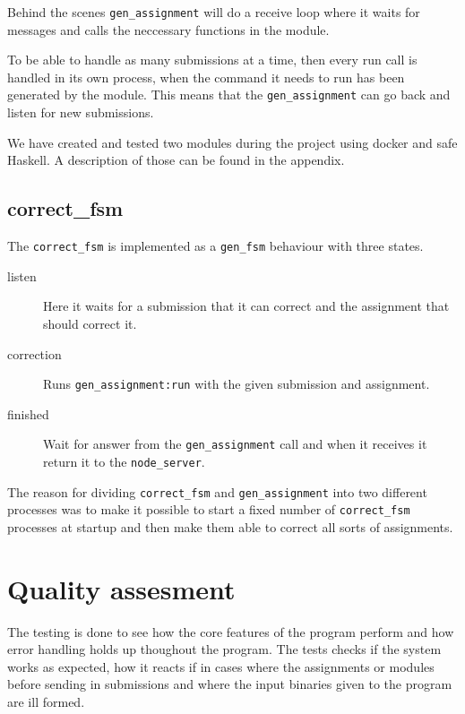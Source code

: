 Behind the scenes \texttt{gen\_assignment} will do a receive loop where it waits
for messages and calls the neccessary functions in the module.

To be able to handle as many submissions at a time, then every run call is
handled in its own process, when the command it needs to run has been generated
by the module. This means that the \texttt{gen\_assignment} can go back and
listen for new submissions.

We have created and tested two modules during the project using docker and safe
Haskell. A description of those can be found in the appendix.

\subsection{correct\_fsm}
The \texttt{correct\_fsm} is implemented as a \texttt{gen\_fsm} behaviour with
three states.
\begin{description}
    \item[listen] Here it waits for a submission that it can correct and the
    assignment that should correct it.
    \item[correction] Runs \texttt{gen\_assignment:run} with the given
    submission and assignment.
    \item[finished] Wait for answer from the \texttt{gen\_assignment} call and
    when it receives it return it to the \texttt{node\_server}.
\end{description}

The reason for dividing \texttt{correct\_fsm} and \texttt{gen\_assignment} into
two different processes was to make it possible to start a fixed number of
\texttt{correct\_fsm} processes at startup and then make them able to correct
all sorts of assignments.

\section{Quality assesment}
The testing is done to see how the core features of the program perform and how error handling holds up thoughout the program. The tests checks if the system works as expected, how it reacts if in cases where the assignments or modules before sending in submissions and where the input binaries given to the program are ill formed.

